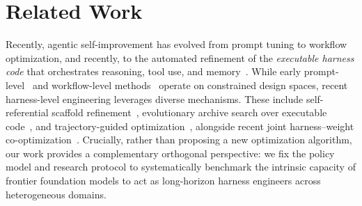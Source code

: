 \section{Related Work}


Recently, agentic self-improvement has evolved from prompt tuning to workflow optimization, and recently, to the automated refinement of the \emph{executable harness code} that orchestrates reasoning, tool use, and memory~\cite{weng2026harness}. While early prompt-level~\cite{promptbreeder,gepa,ace} and workflow-level methods~\cite{adas,aflow} operate on constrained design spaces, recent harness-level engineering leverages diverse mechanisms. These include self-referential scaffold refinement~\cite{stop,godelagent,dgm,selfharness}, evolutionary archive search over executable code~\cite{metaharness,vero}, and trajectory-guided optimization~\cite{harnessx}, alongside recent joint harness--weight co-optimization~\cite{sia}. 
Crucially, rather than proposing a new optimization algorithm, our work provides a complementary orthogonal perspective: we fix the policy model and research protocol to systematically benchmark the intrinsic capacity of frontier foundation models to act as long-horizon harness engineers across heterogeneous domains.

